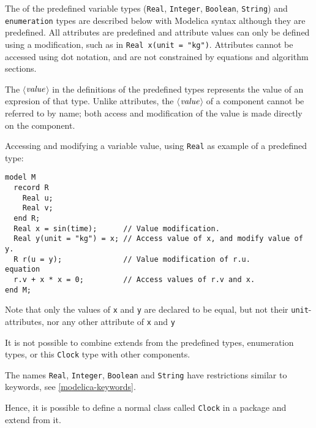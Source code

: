 The  of the predefined variable types (\lstinline!Real!, \lstinline!Integer!, \lstinline!Boolean!, \lstinline!String!) and \lstinline!enumeration! types are described below with Modelica syntax although they are predefined.
All attributes are predefined and attribute values can only be defined using a modification, such as in \lstinline!Real x(unit = "kg")!.
Attributes cannot be accessed using dot notation, and are not constrained by equations and algorithm sections.

The $\langle$$\mbox{\emph{value}}$$\rangle$ in the definitions of the predefined types represents the value of an expresion of that type.
Unlike attributes, the $\langle$$\mbox{\emph{value}}$$\rangle$ of a component cannot be referred to by name; both access and modification of the value is made directly on the component.

\begin{example}
Accessing and modifying a variable value, using \lstinline!Real! as example of a predefined type:
\begin{lstlisting}[language=modelica]
model M
  record R
    Real u;
    Real v;
  end R;
  Real x = sin(time);      // Value modification.
  Real y(unit = "kg") = x; // Access value of x, and modify value of y.
  R r(u = y);              // Value modification of r.u.
equation
  r.v + x * x = 0;         // Access values of r.v and x.
end M;
\end{lstlisting}
Note that only the values of \lstinline!x! and \lstinline!y! are declared to be equal, but not their \lstinline!unit!-attributes, nor any other attribute of \lstinline!x! and \lstinline!y!
\end{example}

It is not possible to combine extends from the predefined types, enumeration types, or this \lstinline!Clock! type with other components.

The names \lstinline!Real!, \lstinline!Integer!, \lstinline!Boolean! and \lstinline!String! have restrictions similar to keywords, see \cref{modelica-keywords}.

\begin{nonnormative}
Hence, it is possible to define a normal class called \lstinline!Clock! in a package and extend from it.
\end{nonnormative}

